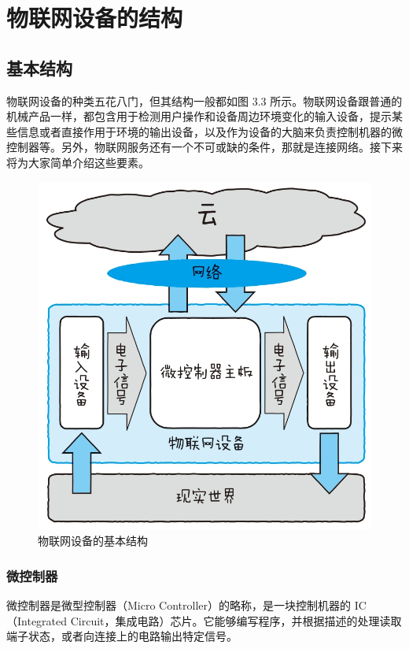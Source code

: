 \documentclass[12pt,UTF8]{ctexbook}
\begin{document}
\section{物联网设备的结构}

\subsection{基本结构}

物联网设备的种类五花八门，但其结构一般都如图 3.3 所示。物联网设备跟普通的机械产品一样，都包含用于检测用户操作和设备周边环境变化的输入设备，提示某些信息或者直接作用于环境的输出设备，以及作为设备的大脑来负责控制机器的微控制器等。另外，物联网服务还有一个不可或缺的条件，那就是连接网络。接下来将为大家简单介绍这些要素。

\begin{figure}[htbp]
	\centering
	\includegraphics[width=1\linewidth]{54}
	\caption{物联网设备的基本结构}
	\label{fig:1}
\end{figure}

\subsubsection{微控制器}

微控制器是微型控制器（Micro Controller）的略称，是一块控制机器的 IC（Integrated Circuit，集成电路）芯片。它能够编写程序，并根据描述的处理读取端子状态，或者向连接上的电路输出特定信号。
\end{document}
